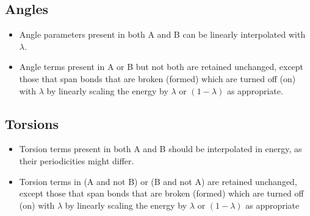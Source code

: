 \documentclass[aps,pre,twocolumn,superscriptaddress,nofootinbib]{revtex4-1}
\begin{document}
\subsection{Angles}
\begin{itemize}
  \item Angle parameters present in both A and B can be linearly interpolated with $\lambda$.
  \item Angle terms present in A or B but not both are retained unchanged, except those that span bonds that are broken (formed) which are turned off (on) with $\lambda$ by linearly scaling the energy by $\lambda$ or $(1-\lambda)$ as appropriate.
\end{itemize}

\subsection{Torsions}
\begin{itemize}
  \item Torsion terms present in both A and B should be interpolated in energy, as their periodicities might differ.
  \item Torsion terms in (A and not B) or (B and not A) are retained unchanged, except those that span bonds that are broken (formed) which are turned off (on) with $\lambda$ by linearly scaling the energy by $\lambda$ or $(1-\lambda)$ as appropriate
\end{itemize}
\end{document}
